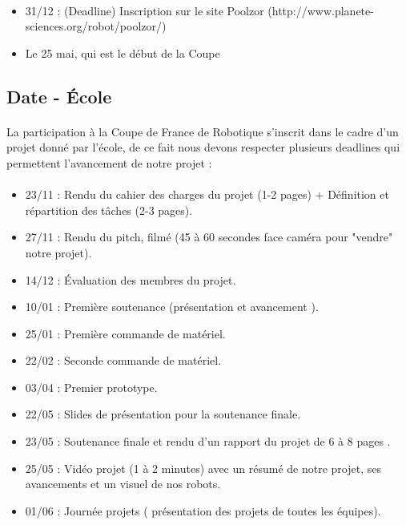 \documentclass[12pt,a4paper]{article}
\begin{document}
\paragraph{}
\begin{itemize}
\item 31/12 : (Deadline) Inscription sur le site Poolzor
	 (http://www.planete-sciences.org/robot/poolzor/)
\item Le 25 mai, qui est le début de la Coupe
\end{itemize}

\subsection{Date - École}
\paragraph{}
La participation à la Coupe de France de Robotique s'inscrit dans le cadre d'un projet donné 
par l'école, de ce fait nous devons respecter plusieurs deadlines qui permettent l'avancement de notre projet :
\paragraph{}
\begin{itemize}
\item 23/11 : Rendu du cahier des charges du projet  (1-2 pages)  +  Définition et répartition des tâches (2-3 pages).
\item 27/11 : Rendu du pitch, filmé (45 à 60 secondes face caméra pour "vendre" notre projet). 
\item 14/12 : Évaluation des membres du projet.
\item 10/01 : Première soutenance (présentation et avancement ).
\item 25/01 : Première commande de matériel.
\item 22/02 : Seconde commande de matériel.
\item 03/04 : Premier prototype.
\item 22/05 : Slides de présentation pour la soutenance finale.
\item 23/05 : Soutenance finale et rendu d'un rapport du projet de 6 à 8 pages .
\item 25/05 : Vidéo projet (1 à 2 minutes) avec un résumé de notre projet, ses avancements et un visuel de nos robots.
\item 01/06 : Journée projets ( présentation  des projets de toutes les équipes).
\end{itemize}
\end{document}
